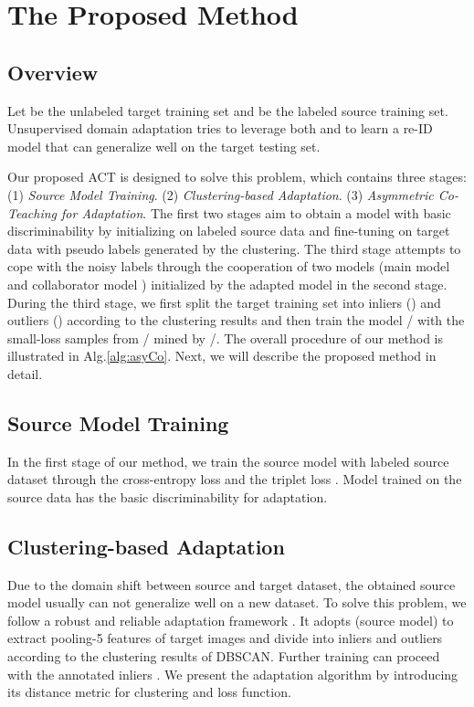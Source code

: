 \documentclass[letterpaper]{article} \usepackage{aaai20}  \usepackage{times}  \usepackage{helvet} \usepackage{courier}  \usepackage[hyphens]{url}  \usepackage{graphicx} \urlstyle{rm} \def\UrlFont{\rm}  \usepackage{graphicx}  \frenchspacing  \setlength{\pdfpagewidth}{8.5in}  \setlength{\pdfpageheight}{11in}  \usepackage{color}
\begin{document}
\section{The Proposed Method}
\subsection{Overview}

Let  be the unlabeled target training set and  be the labeled source training set. Unsupervised domain adaptation tries to leverage both  and  to learn a re-ID model that can generalize well on the target testing set. 

Our proposed ACT is designed to solve this problem, which contains three stages: (1) \textit{Source Model Training}. (2) \textit{Clustering-based Adaptation}. (3) \textit{Asymmetric Co-Teaching for Adaptation}. The first two stages aim to obtain a model with basic discriminability by initializing on labeled source data and fine-tuning on target data with pseudo labels generated by the clustering. The third stage attempts to cope with the noisy labels through the cooperation of two models (main model  and collaborator model ) initialized by the adapted model in the second stage. During the third stage, we first split the target training set into inliers () and outliers () according to the clustering results and then train the model / with  the  small-loss samples  from / mined by /. The overall procedure of our method is illustrated in Alg.\ref{alg:asyCo}. Next, we will describe the proposed method in detail.


\subsection{Source Model Training} 
In the first stage of our method, we train the source model  with labeled source dataset  through the cross-entropy loss and the triplet loss \cite{HermansBeyer2017Arxiv}. Model  trained on the source data has the basic discriminability for adaptation. 



\subsection{Clustering-based Adaptation}
Due to the domain shift between source and target dataset, the obtained source model  usually can not generalize well on a new dataset. To solve this problem, we follow a robust and reliable adaptation framework \cite{song2018unsupervised}. It adopts  (source model) to extract pooling-5 features of target images and divide  into inliers  and outliers  according to the clustering results of DBSCAN. Further training can proceed with the annotated inliers . We present the adaptation algorithm by introducing its distance metric for clustering and loss function.
\end{document}
